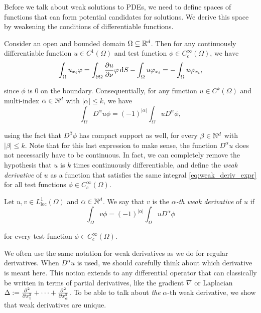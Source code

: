 Before we talk about weak solutions to PDEs, we need to define spaces of functions that can form potential candidates for solutions. We derive this space by weakening the conditions of differentiable functions.

Consider an open and bounded domain $\Omega \subseteq \R^{d}$. Then for any continuously differentiable function $u \in C^{1}(\Omega)$ and test function $\phi \in C_{c}^{\infty}(\Omega)$, we have
%
\begin{equation}
    \label{random}
    \int_{\Omega} u_{x_i} \phi = \int_{\partial \Omega} \frac{\partial u}{\partial \nu} \phi \d S - \int_{\Omega} u \phi_{x_i} = - \int_{\Omega} u \phi_{x_i} ,
\end{equation}

\noindent
since $\phi$ is 0 on the boundary. Consequentially, for any function $u \in C^k(\Omega)$ and multi-index $\alpha \in \N^{d}$ with $|\alpha| \leq k$, we have
%
\begin{equation}
    \label{eq:weak_deriv_expr}
    \int_{\Omega} D^{\alpha} u \phi = (-1)^{|\alpha|} \int_{\Omega} u D^{\alpha}  \phi,
\end{equation}

\noindent
using the fact that $D^\beta \phi$ has compact support as well, for every $\beta \in \N^d$ with $|\beta| \leq k$. Note that for this last expression to make sense, the function $D^\alpha u$ does not necessarily have to be continuous. In fact, we can completely remove the hypothesis that $u$ is $k$ times continuously differentiable, and define the \emph{weak derivative} of $u$ as a function that satisfies the same integral \cref{eq:weak_deriv_expr} for all test functions $\phi \in C^\infty_c(\Omega)$.

\begin{definition}{}{}
    Let $u, v \in L^{1}_{\text{loc}}(\Omega)$ and $\alpha \in \N^{d}$. We say that $v$ is the \emph{$\alpha$-th weak derivative} of $u$ if
    \begin{equation}
        \int_{\Omega} v \phi = (-1)^{|\alpha|} \int_{\Omega} u D^{\alpha} \phi
    \end{equation}

    \noindent
    for every test function $\phi \in C^{\infty}_{c}(\Omega)$.
\end{definition}

We often use the same notation for weak derivatives as we do for regular derivatives. When $D^\alpha u$ is used, we should carefully think about which derivative is meant here. This notion extends to any differential operator that can classically be written in terms of partial derivatives, like the gradient $\nabla$ or Laplacian $\Delta := \pderiv[^2]{x^2_1} + \dots + \pderiv[^2]{x^2_d}$. To be able to talk about \emph{the} $\alpha$-th weak derivative, we show that weak derivatives are unique.

